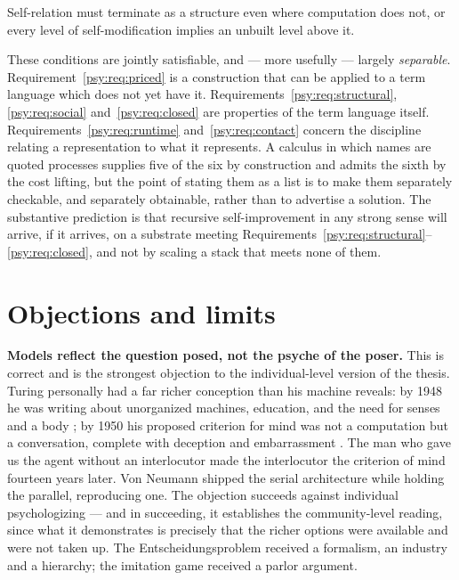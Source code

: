 \begin{requirement}
\label{psy:req:closed}
Self-relation must terminate as a structure even where computation
does not, or every level of self-modification implies an unbuilt
level above it.
\end{requirement}

These conditions are jointly satisfiable, and --- more usefully ---
largely \emph{separable}.
Requirement~\ref{psy:req:priced} is a construction that can be
applied to a term language which does not yet have it.
Requirements~\ref{psy:req:structural}, \ref{psy:req:social}
and~\ref{psy:req:closed} are properties of the term language itself.
Requirements~\ref{psy:req:runtime} and~\ref{psy:req:contact} concern
the discipline relating a representation to what it represents.
A calculus in which names are quoted processes supplies five of the
six by construction and admits the sixth by the cost lifting, but
the point of stating them as a list is to make them separately
checkable, and separately obtainable, rather than to advertise a
solution.
The substantive prediction is that recursive self-improvement in any
strong sense will arrive, if it arrives, on a substrate meeting
Requirements~\ref{psy:req:structural}--\ref{psy:req:closed}, and not
by scaling a stack that meets none of them.

\section{Objections and limits}
\label{psy:sec:objections}

\textbf{Models reflect the question posed, not the psyche of the
poser.}
This is correct and is the strongest objection to the
individual-level version of the thesis.
Turing personally had a far richer conception than his machine
reveals: by 1948 he was writing about unorganized machines,
education, and the need for senses and a body \cite{turing1948}; by
1950 his proposed criterion for mind was not a computation but a
conversation, complete with deception and embarrassment
\cite{turing1950}.
The man who gave us the agent without an interlocutor made the
interlocutor the criterion of mind fourteen years later.
Von Neumann shipped the serial architecture while holding the
parallel, reproducing one.
The objection succeeds against individual psychologizing --- and in
succeeding, it establishes the community-level reading, since what
it demonstrates is precisely that the richer options were available
and were not taken up.
The Entscheidungsproblem received a formalism, an industry and a
hierarchy; the imitation game received a parlor argument.

